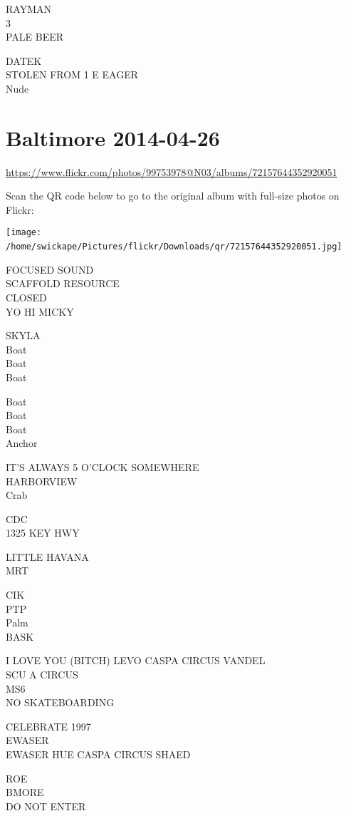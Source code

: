 \documentclass[10pt,letterpaper]{article}
\begin{document}
RAYMAN\\
3\\
PALE BEER

DATEK\\
STOLEN FROM 1 E EAGER\\
Nude
\

\section*{Baltimore 2014-04-26}

\url{https://www.flickr.com/photos/99753978@N03/albums/72157644352920051}

Scan the QR code below to go to the original album with full-size photos on Flickr:

\texttt{[image: /home/swickape/Pictures/flickr/Downloads/qr/72157644352920051.jpg]}
\

FOCUSED SOUND\\
SCAFFOLD RESOURCE\\
CLOSED\\
YO HI MICKY

SKYLA\\
Boat\\
Boat\\
Boat

Boat\\
Boat\\
Boat\\
Anchor

IT'S ALWAYS 5 O'CLOCK SOMEWHERE\\
HARBORVIEW\\
Crab

CDC\\
1325 KEY HWY

LITTLE HAVANA\\
MRT

CIK\\
PTP\\
Palm\\
BASK

I LOVE YOU (BITCH) LEVO CASPA CIRCUS VANDEL\\
SCU A CIRCUS\\
MS6\\
NO SKATEBOARDING

CELEBRATE 1997\\
EWASER\\
EWASER HUE CASPA CIRCUS SHAED

ROE\\
BMORE\\
DO NOT ENTER
\end{document}
